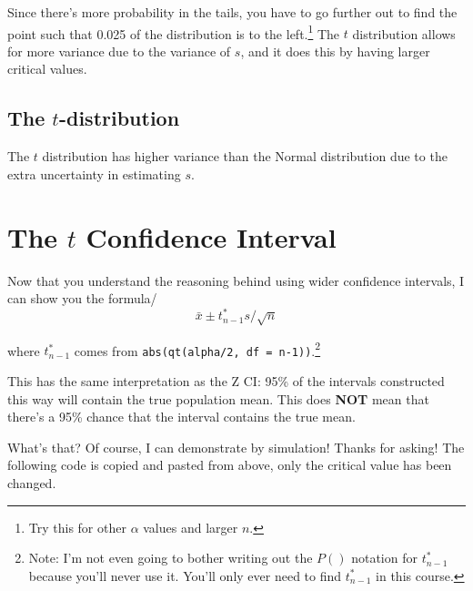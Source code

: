 \documentclass[
  letterpaper,
  DIV=11,
  numbers=noendperiod]{scrreprt}
\begin{document}
Since there's more probability in the tails, you have to go further out
to find the point such that 0.025 of the distribution is to the
left.\footnote{Try this for other \(\alpha\) values and larger \(n\).}
The \(t\) distribution allows for more variance due to the variance of
\(s\), and it does this by having larger critical values.

\hypertarget{the-t-distribution-1}{%
\subsection{\texorpdfstring{The
\(t\)-distribution}{The t-distribution}}\label{the-t-distribution-1}}

The \(t\) distribution has higher variance than the Normal distribution
due to the extra uncertainty in estimating \(s\).

\hypertarget{the-t-confidence-interval}{%
\section{\texorpdfstring{The \(t\) Confidence
Interval}{The t Confidence Interval}}\label{the-t-confidence-interval}}

Now that you understand the reasoning behind using wider confidence
intervals, I can show you the formula/ \[
\bar x \pm t_{n-1}^*s/\sqrt{n}
\]

where \(t^*_{n-1}\) comes from
\texttt{abs(qt(alpha/2,\ df\ =\ n-1))}.\footnote{Note: I'm not even
  going to bother writing out the \(P()\) notation for \(t^*_{n-1}\)
  because you'll never use it. You'll only ever need to find
  \(t^*_{n-1}\) in this course.}

This has the same interpretation as the Z CI: 95\% of the intervals
constructed this way will contain the true population mean. This does
\textbf{NOT} mean that there's a 95\% chance that the interval contains
the true mean.

What's that? Of course, I can demonstrate by simulation! Thanks for
asking! The following code is copied and pasted from above, only the
critical value has been changed.
\end{document}
